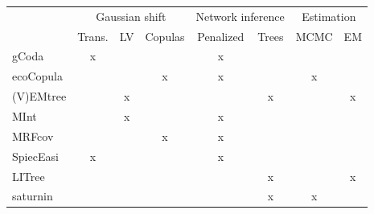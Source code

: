  
\begin{table}[H]
\begin{tabular}{l|ccc|cc|cc|}
\cline{2-8}
 & \multicolumn{3}{c|}{ Gaussian shift} & \multicolumn{2}{c|}{Network inference} & \multicolumn{2}{c|}{Estimation} \\ \cline{2-8} 
 & Trans. & LV & Copulas & Penalized & Trees & MCMC & EM \\ \hline
\multicolumn{1}{|l|}{gCoda} & x &  &  & x &  &  &  \\ \hline
\multicolumn{1}{|l|}{ecoCopula} &  &  & x & x &  & x &  \\ \hline
\multicolumn{1}{|l|}{(V)EMtree} &  & x &  &  & x &  & x \\ \hline
\multicolumn{1}{|l|}{MInt} &  & x &  & x &  &  &  \\ \hline
\multicolumn{1}{|l|}{MRFcov} &  &  & x & x &  &  &  \\ \hline
\multicolumn{1}{|l|}{SpiecEasi} & x &  &  & x &  &  &  \\ \hline
\multicolumn{1}{|l|}{LITree} & \multicolumn{1}{l}{\cellcolor[HTML]{d8d8d8}} & \multicolumn{1}{l}{\cellcolor[HTML]{d8d8d8}} & \multicolumn{1}{l|}{\cellcolor[HTML]{d8d8d8}} & \multicolumn{1}{l}{} & \multicolumn{1}{c|}{x} & \multicolumn{1}{l}{} & \multicolumn{1}{c|}{x} \\ \hline
\multicolumn{1}{|l|}{saturnin} & \multicolumn{1}{l}{\cellcolor[HTML]{d8d8d8}} & \multicolumn{1}{l}{\cellcolor[HTML]{d8d8d8}} & \multicolumn{1}{l|}{\cellcolor[HTML]{d8d8d8}} & \multicolumn{1}{l}{} & \multicolumn{1}{c|}{x} & \multicolumn{1}{c}{x} & \multicolumn{1}{l|}{} \\ \hline

\end{tabular}
\end{table}

  